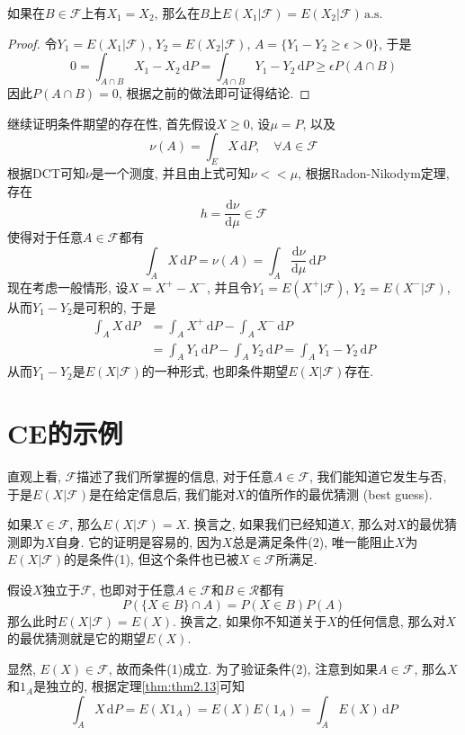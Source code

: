 \documentclass[cn, 12pt, math=mtpro2, bibstyle=apa, blue, twocol]{elegantbook}
\newcommand{\F}{\mathcal{F}}
\begin{document}
\begin{theorem}
  如果在$B\in\F$上有$X_1=X_2$, 那么在$B$上$E(X_1|\F)=E(X_2|\F)\,\text{a.s.}$
\end{theorem}
\begin{proof}
  令$Y_1=E(X_1|\F)$, $Y_2=E(X_2|\F)$, $A=\{Y_1-Y_2\geq\epsilon>0\}$, 于是
  $$0=\int_{A \cap B}X_1-X_2\,\text{d}P=\int_{A\cap B}Y_1-Y_2\,\text{d}P\geq\epsilon P(A\cap B)$$
  因此$P(A\cap B)=0$, 根据之前的做法即可证得结论.
\end{proof}

继续证明条件期望的存在性, 首先假设$X\geq 0$, 设$\mu=P$, 以及
$$\nu(A)=\int_E X\,\text{d}P,\quad \forall A\in\F$$
根据DCT可知$\nu$是一个测度, 并且由上式可知$\nu<<\mu$, 根据Radon-Nikodym定理, 存在
$$h=\frac{\text{d}\nu}{\text{d}\mu}\in\F$$
使得对于任意$A\in\F$都有
$$\int_AX\,\text{d}P=\nu(A)=\int_A\frac{\text{d}\nu}{\text{d}\mu}\,\text{d}P$$
现在考虑一般情形, 设$X=X^+-X^-$, 并且令$Y_1=E(X^+|\F)$, $Y_2=E(X^-|\F)$, 从而$Y_1-Y_2$是可积的, 于是
\begin{align*}
\int_AX\,\text{d}P&=\int_AX^+\,\text{d}P-\int_AX^-\,\text{d}P \\
&=\int_AY_1\,\text{d}P-\int_AY_2\,\text{d}P=\int_AY_1-Y_2\,\text{d}P
\end{align*}
从而$Y_1-Y_2$是$E(X|\F)$的一种形式, 也即条件期望$E(X|\F)$存在.
\section{CE的示例}
直观上看, $\F$描述了我们所掌握的信息, 对于任意$A\in\F$, 我们能知道它发生与否, 于是$E(X|\F)$是在给定信息后, 我们能对$X$的值所作的最优猜测 (best guess).
\begin{example}\label{exp:exp4.1}
如果$X\in\F$, 那么$E(X|\F)=X$. 换言之, 如果我们已经知道$X$, 那么对$X$的最优猜测即为$X$自身. 它的证明是容易的, 因为$X$总是满足条件(2), 唯一能阻止$X$为$E(X|\F)$的是条件(1), 但这个条件也已被$X\in\F$所满足.
\end{example}

\begin{example}
假设$X$独立于$\F$, 也即对于任意$A\in\F$和$B\in\mathcal{R}$都有
$$P(\{X\in B\}\cap A)=P(X\in B)P(A)$$
那么此时$E(X|\F)=E(X)$. 换言之, 如果你不知道关于$X$的任何信息, 那么对$X$的最优猜测就是它的期望$E(X)$.

显然, $E(X)\in\F$, 故而条件(1)成立. 为了验证条件(2), 注意到如果$A\in\F$, 那么$X$和$1_A$是独立的, 根据定理\ref{thm:thm2.13}可知
$$\int_AX\,\text{d}P=E(X1_A)=E(X)E(1_A)=\int_AE(X)\,\text{d}P$$
\end{example}
\end{document}

